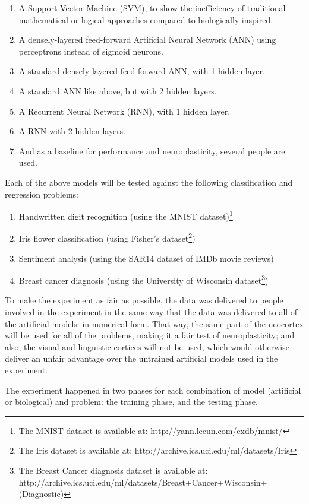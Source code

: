 \documentclass[]{report}
\begin{document}
\begin{enumerate}
	\item A Support Vector Machine (SVM), to show the inefficiency of traditional mathematical or logical approaches compared to biologically inspired.
	\item A densely-layered feed-forward Artificial Neural Network (ANN) using perceptrons instead of sigmoid neurons.
	\item A standard densely-layered feed-forward ANN, with 1 hidden layer.
	\item A standard ANN like above, but with 2 hidden layers.
	\item A Recurrent Neural Network (RNN), with 1 hidden layer.
	\item A RNN with 2 hidden layers.
	\item And as a baseline for performance and neuroplasticity, several people are used.
\end{enumerate}

Each of the above models will be tested against the following classification and regression problems:

\begin{enumerate}
	\item Handwritten digit recognition (using the MNIST dataset)\footnote{The MNIST dataset is available at: http://yann.lecun.com/exdb/mnist/}
	\item Iris flower classification (using Fisher's dataset\footnote{The Iris dataset is available at: http://archive.ics.uci.edu/ml/datasets/Iris})
	\item Sentiment analysis (using the SAR14 dataset of IMDb movie reviews)
	\item Breast cancer diagnosis (using the University of Wisconsin dataset\footnote{The Breast Cancer diagnosis dataset is available at: http://archive.ics.uci.edu/ml/datasets/Breast+Cancer+Wisconsin+(Diagnostic)})
\end{enumerate}

To make the experiment as fair as possible, the data was delivered to people involved in the experiment in the same way that the data was delivered to all of the artificial models: in numerical form. That way, the same part of the neocortex will be used for all of the problems, making it a fair test of neuroplasticity; and also, the visual and linguistic cortices will not be used, which would otherwise deliver an unfair advantage over the untrained artificial models used in the experiment.

The experiment happened in two phases for each combination of model (artificial or biological) and problem: the training phase, and the testing phase.
\end{document}
